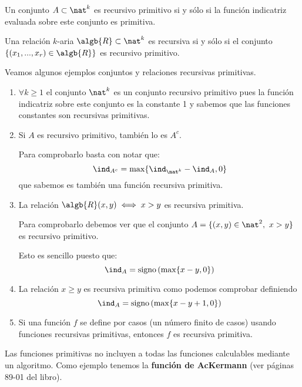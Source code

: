 \begin{defn}
Un conjunto $A \subset \nat^k$ es recursivo primitivo si y sólo si la función indicatriz evaluada sobre este conjunto es primitiva.
\end{defn}

\begin{defn}
Una relación $k$-aria $\algb{R} \subset \nat^k$ es recursiva  si y sólo si el conjunto $\{(x_1,...,x_r)\in \algb{R}\}$ es recursivo primitivo.
\end{defn}

Veamos algunos ejemplos conjuntos y relaciones recursivas primitivas.
\begin{example}
\begin{enumerate}
\item $\forall k \geq 1$ el conjunto $\nat^k$ es un conjunto recursivo primitivo pues la función indicatriz sobre este conjunto es la constante 1 y sabemos que las funciones constantes son recursivas primitivas.

\item Si $A$ es recursivo primitivo, también lo es $A^c$.

Para comprobarlo basta con notar que:
\[\ind_{A^c} = \max\{\ind_{\nat^k}-\ind_{A},0\}\]
que sabemos es también una función recursiva primitiva.

\item La relación $\algb{R}(x,y) \iff x>y$ es recursiva primitiva.

Para comprobarlo debemos ver que el conjunto $A=\{(x,y) \in \nat^2, \ x>y\} $ es recursivo primitivo.

Esto es sencillo puesto que:
\[\ind_A = \text{signo}\left(\max\{x-y,0\}\right)\]

\item La relación $x\geq y$ es recursiva primitiva como podemos comprobar definiendo
\[\ind_A = \text{signo}\left(\max\{x-y+1,0\}\right)\]

\item Si una función $f$ se define por casos (un número finito de casos) usando funciones recursivas primitivas, entonces $f$ es recursiva primitiva.
\end{enumerate}
\end{example}

Las funciones primitivas no incluyen a todas las funciones calculables mediante un algoritmo. Como ejemplo tenemos la \textbf{función de AcKermann} (ver páginas 89-01 del libro).

